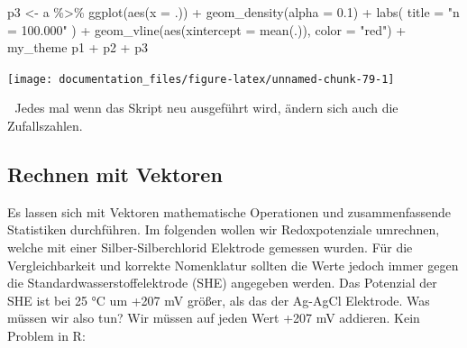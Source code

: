 \documentclass[
]{article}
\newenvironment{Shaded}{\begin{snugshade}}{\end{snugshade}}
\newcommand{\AttributeTok}[1]{\textcolor[rgb]{0.77,0.63,0.00}{#1}}
\newcommand{\FloatTok}[1]{\textcolor[rgb]{0.00,0.00,0.81}{#1}}
\newcommand{\FunctionTok}[1]{\textcolor[rgb]{0.00,0.00,0.00}{#1}}
\newcommand{\NormalTok}[1]{#1}
\newcommand{\OtherTok}[1]{\textcolor[rgb]{0.56,0.35,0.01}{#1}}
\newcommand{\SpecialCharTok}[1]{\textcolor[rgb]{0.00,0.00,0.00}{#1}}
\newcommand{\StringTok}[1]{\textcolor[rgb]{0.31,0.60,0.02}{#1}}
\begin{document}
\begin{Shaded}
\begin{Highlighting}[]
\NormalTok{p3 }\OtherTok{\textless{}{-}}\NormalTok{ a }\SpecialCharTok{\%\textgreater{}\%}
    \FunctionTok{ggplot}\NormalTok{(}\FunctionTok{aes}\NormalTok{(}\AttributeTok{x =}\NormalTok{ .)) }\SpecialCharTok{+}
    \FunctionTok{geom\_density}\NormalTok{(}\AttributeTok{alpha =} \FloatTok{0.1}\NormalTok{) }\SpecialCharTok{+}
    \FunctionTok{labs}\NormalTok{(}
        \AttributeTok{title =} \StringTok{"n = 100.000"}
\NormalTok{    ) }\SpecialCharTok{+}
    \FunctionTok{geom\_vline}\NormalTok{(}\FunctionTok{aes}\NormalTok{(}\AttributeTok{xintercept =} \FunctionTok{mean}\NormalTok{(.)), }\AttributeTok{color =} \StringTok{"red"}\NormalTok{) }\SpecialCharTok{+}
\NormalTok{    my\_theme}
\NormalTok{p1 }\SpecialCharTok{+}\NormalTok{ p2 }\SpecialCharTok{+}\NormalTok{ p3}
\end{Highlighting}
\end{Shaded}

\begin{center}\texttt{[image: documentation\_files/figure-latex/unnamed-chunk-79-1]} \end{center}

🚨 Jedes mal wenn das Skript neu ausgeführt wird, ändern sich auch die Zufallszahlen.

\hypertarget{rechnen-mit-vektoren}{%
\subsection{Rechnen mit Vektoren}\label{rechnen-mit-vektoren}}

Es lassen sich mit Vektoren mathematische Operationen und zusammenfassende Statistiken durchführen. Im folgenden wollen wir Redoxpotenziale umrechnen, welche mit einer Silber-Silberchlorid Elektrode gemessen wurden. Für die Vergleichbarkeit und korrekte Nomenklatur sollten die Werte jedoch immer gegen die Standardwasserstoffelektrode (SHE) angegeben werden. Das Potenzial der SHE ist bei 25 °C um +207 mV größer, als das der Ag-AgCl Elektrode. Was müssen wir also tun? Wir müssen auf jeden Wert +207 mV addieren. Kein Problem in R:
\end{document}
